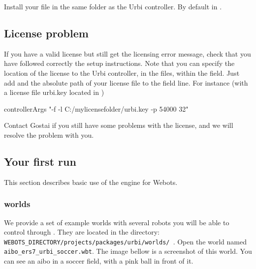 Install your  file in the same folder as the Urbi
controller.  By default in
.

\subsection{License problem}
\label{webots.problem}%

If you have a valid license but still get the licensing error message,
check that you have followed correctly the setup instructions. Note
that you can specify the location of the  license to
the Urbi controller, in the  files, within the
 field. Just add  and the absolute
path of your license file to the field line. For instance (with a
license file urbi.key located in )

\begin{shell}
controllerArgs "-f -l C:/mylicensefolder/urbi.key  -p 54000 32"
\end{shell}

Contact Gostai if you still have some problems with the license, and
we will resolve the problem with you.

\subsection{Your first run}
\label{webots.firstrun}%

This section describes basic use of the \urbi engine for Webots.

\subsubsection{\urbi worlds}
\label{webots.firstrun.openworld}%

We provide a set of example worlds with several robots you will be
able to control through \urbi. They are located in the directory:
\nolinkurl{WEBOTS_DIRECTORY/projects/packages/urbi/worlds/ }.  Open
the world named \nolinkurl{aibo_ers7_urbi_soccer.wbt}. The image
bellow is a screenshot of this world. You can see an aibo in a soccer
field, with a pink ball in front of it.





